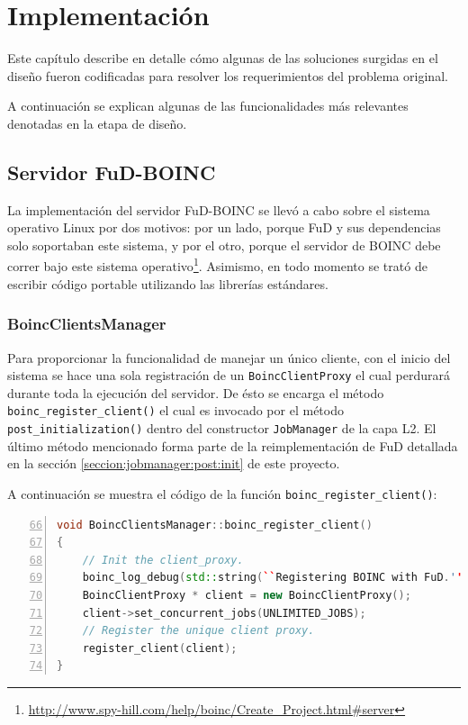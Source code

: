 \chapter{Implementación}
\label{chapter:implementacion}

Este capítulo describe en detalle cómo algunas de las soluciones surgidas en el diseño fueron codificadas para resolver los requerimientos del problema original.

A continuación se explican algunas de las funcionalidades más relevantes denotadas en la etapa de diseño.


\section{Servidor FuD-BOINC}
La implementación del servidor FuD-BOINC se llevó a cabo sobre el sistema operativo Linux por dos motivos: por un lado, porque FuD y sus dependencias solo soportaban este sistema, y por el otro, porque el servidor de BOINC debe correr bajo este sistema operativo\footnote{\url{http://www.spy-hill.com/help/boinc/Create_Project.html\#server}}. Asimismo, en todo momento se trató de escribir código portable utilizando las librerías estándares.

	\subsection{BoincClientsManager}
Para proporcionar la funcionalidad de manejar un único cliente, con el inicio del sistema se hace una sola registración de un \texttt{BoincClientProxy} el cual perdurará durante toda la ejecución del servidor. De ésto se encarga el método \texttt{boinc\_register\_client()} el cual es invocado por el método \texttt{post\_initialization()} dentro del constructor \texttt{JobManager} de la capa L2. El último método mencionado forma parte de la reimplementación de FuD detallada en la sección \ref{seccion:jobmanager:post:init} de este proyecto. 

A continuación se muestra el código de la función \texttt{boinc\_register\_client()}:

\newpage

\begin{lstlisting}[frame=shadowbox, language=c++, numbers=left, xleftmargin=8mm, framexleftmargin=20pt, basicstyle=\footnotesize, numberstyle=\footnotesize, captionpos=b, caption={Método \texttt{boinc\_register\_client()} de la clase \texttt{BoincClientsManager}}, label=listing:BoincClientsManager:register:client, backgroundcolor=\color{gris}, firstnumber=66, keywordstyle=\color{Blue}]
void BoincClientsManager::boinc_register_client()
{
    // Init the client_proxy.
    boinc_log_debug(std::string(``Registering BOINC with FuD.''));
    BoincClientProxy * client = new BoincClientProxy();
    client->set_concurrent_jobs(UNLIMITED_JOBS);
    // Register the unique client proxy.
    register_client(client);
}
\end{lstlisting}

